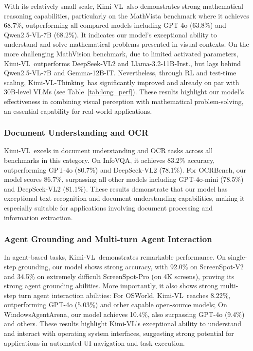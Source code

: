\documentclass{article}
\newcommand{\ourname}{{Kimi-VL}}
\newcommand{\ourreasoningname}{{\ourname-Thinking}}
\begin{document}
With its relatively small scale, \ourname~also demonstrates strong mathematical reasoning capabilities, particularly on the MathVista benchmark where it achieves 68.7\%, outperforming all compared models including GPT-4o (63.8\%) and Qwen2.5-VL-7B (68.2\%). It indicates our model's exceptional ability to understand and solve mathematical problems presented in visual contexts. On the more challenging MathVision benchmark, due to limited activated parameters, \ourname~outperforms DeepSeek-VL2 and Llama-3.2-11B-Inst., but lags behind Qwen2.5-VL-7B and Gemma-12B-IT. Nevertheless, through RL and test-time scaling, \ourreasoningname~has significantly improved and already on par with 30B-level VLMs (see Table~\ref{tab:long_perf}). These results highlight our model's effectiveness in combining visual perception with mathematical problem-solving, an essential capability for real-world applications.


\subsubsection{Document Understanding and OCR}










\ourname~excels in document understanding and OCR tasks across all benchmarks in this category. On InfoVQA, it achieves 83.2\% accuracy, outperforming GPT-4o (80.7\%) and DeepSeek-VL2 (78.1\%). For OCRBench, our model scores 86.7\%, surpassing all other models including GPT-4o-mini (78.5\%) and DeepSeek-VL2 (81.1\%). 
These results demonstrate that our model has exceptional text recognition and document understanding capabilities, making it especially suitable for applications involving document processing and information extraction.









\subsubsection{Agent Grounding and Multi-turn Agent Interaction}

In agent-based tasks, \ourname~demonstrates remarkable performance. On single-step grounding, our model shows strong accuracy, with 92.0\% on ScreenSpot-V2 and 34.5\% on extremely difficult ScreenSpot-Pro (on 4K screens), proving its strong agent grounding abilities. More importantly, it also shows strong multi-step turn agent interaction abilities: For OSWorld, \ourname~reaches 8.22\%, outperforming GPT-4o (5.03\%) and other capable open-source models; On WindowsAgentArena, our model achieves 10.4\%, also surpassing GPT-4o (9.4\%) and others. These results highlight \ourname's exceptional ability to understand and interact with operating system interfaces, suggesting strong potential for applications in automated UI navigation and task execution.
\end{document}
